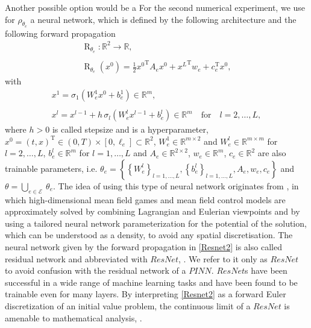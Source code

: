 Another possible option would be a 
For the second numerical experiment, we use for $\rho_{\theta_e}$ a neural network, which is defined by the following architecture and the following forward propagation
\begin{equation} 
    \label{Resnet1}
    \begin{gathered}
        \operatorname{R}_{\theta_e} \colon \mathbb{R}^2 \to \mathbb{R}, \\
        \\
        \operatorname{R}_{\theta_e}\left(x^0\right) = \frac{1}{2} {x^0}^{\mathrm{T}} A_e x^0 + {x^{L}}^{\mathrm{T}} w_e + c^{\mathrm{T}}_e x^0,
    \end{gathered} 
\end{equation} 
with
\begin{equation}
    \label{Resnet2} 
    \begin{gathered}
        x^1 = \sigma_1\left(W^1_e x^{0} + b^1_e\right) \in \mathbb{R}^m, \\
        \\
        x^l = x^{l-1} + h \, \sigma_l\left(W^l_e x^{l-1} + b^l_e\right) \in \mathbb{R}^m \quad \text{for} \quad l = 2, \ldots, L, 
    \end{gathered} 
\end{equation} 
where $h > 0$ is called stepsize and is a hyperparameter, $x^0 = \left(t, x\right)^{\mathrm{T}} \in \left(0, T\right) \times \left[0, \ell_e\right] \subset \mathbb{R}^2$, $W^1_e \in \mathbb{R}^{m \times 2}$ and $W^l_e \in \mathbb{R}^{m \times m}$ for $l = 2, \ldots, L$, $b^l_e \in \mathbb{R}^{m}$ for $l = 1, \ldots, L$ and $A_e \in \mathbb{R}^{2 \times 2}$, $w_e \in \mathbb{R}^m$, $c_e \in \mathbb{R}^2$ are also trainable parameters, i.e. $\theta_e = \left\{ \left\{ W^l_e \right\}_{l = 1, \ldots, L}, \left\{ b^l_e \right\}_{l = 1, \ldots, L}, A_e, w_e, c_e \right\}$ and $\theta = \bigcup_{e \in \mathcal{E}} \ \theta_e$. The idea of using this type of neural network originates from \cite{RuthottoOsherLiNurbekyanFung2020}, in which high-dimensional mean field games and mean field control models are approximately solved by combining Lagrangian and Eulerian viewpoints and by using a tailored neural network parameterization for the potential of the solution, which can be understood as a density, to avoid any spatial discretisation. The neural network given by the forward propagation in \cref{Resnet2} is also called residual network and abbreviated with $ResNet$, \cite{HeZhangRenSun:2015}. We refer to it only as $ResNet$ to avoid confusion with the residual network of a $PINN$. $ResNet$s have been successful in a wide range of machine learning tasks and have been found to be trainable even for many layers. By interpreting \cref{Resnet2} as a forward Euler discretization of an initial value problem, the continuous limit of a $ResNet$ is amenable to mathematical analysis, \cite[p.~6]{RuthottoOsherLiNurbekyanFung2020}. \\

